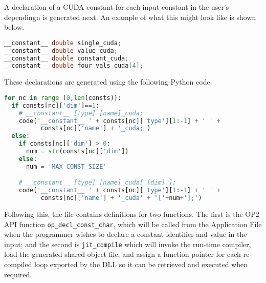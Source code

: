 A declaration of a CUDA constant for each input constant in the user's dependingn is generated next. An example of what this might look like is shown below.
\begin{lstlisting}[backgroundcolor=\color{red!20}, language=C]
__constant__ double single_cuda;
__constant__ double value_cuda;
__constant__ double constant_cuda;
__constant__ double four_vals_cuda[4];
\end{lstlisting}

These declarations are generated using the following Python code.
\begin{lstlisting}[backgroundcolor = \color{lightgray!20}, language=Python]
for nc in range (0,len(consts)):
  if consts[nc]['dim']==1:
    # __constant__ [type] [name]_cuda;
    code('__constant__ ' + consts[nc]['type'][1:-1] + ' ' +
          consts[nc]['name'] + '_cuda;')
  else:
    if consts[nc]['dim'] > 0:
      num = str(consts[nc]['dim'])
    else:
      num = 'MAX_CONST_SIZE'

    # __constant__ [type] [name]_cuda[ [dim] ];
    code('__constant__ ' + consts[nc]['type'][1:-1] + ' ' +
          consts[nc]['name'] + '_cuda' + '['+num+'];')
\end{lstlisting}

Following this, the file contains definitions for two functions. The first is the OP2 API function \verb|op_decl_const_char|, which will be called from the Application File when the programmer wishes to declare a constant identifier and value in the input; and the second is \verb|jit_compile| which will invoke the run-time compiler, load the generated shared object file, and assign a function pointer for each re-compiled loop exported by the DLL so it can be retrieved and executed when required.

